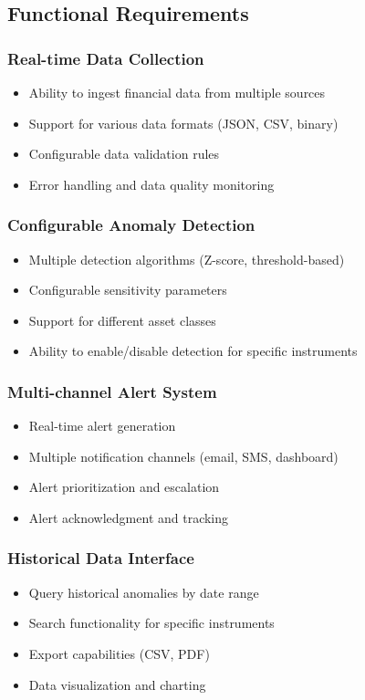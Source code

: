 \subsection{Functional Requirements}

\subsubsection{Real-time Data Collection}
\begin{itemize}
    \item Ability to ingest financial data from multiple sources
    \item Support for various data formats (JSON, CSV, binary)
    \item Configurable data validation rules
    \item Error handling and data quality monitoring
\end{itemize}

\subsubsection{Configurable Anomaly Detection}
\begin{itemize}
    \item Multiple detection algorithms (Z-score, threshold-based)
    \item Configurable sensitivity parameters
    \item Support for different asset classes
    \item Ability to enable/disable detection for specific instruments
\end{itemize}

\subsubsection{Multi-channel Alert System}
\begin{itemize}
    \item Real-time alert generation
    \item Multiple notification channels (email, SMS, dashboard)
    \item Alert prioritization and escalation
    \item Alert acknowledgment and tracking
\end{itemize}

\subsubsection{Historical Data Interface}
\begin{itemize}
    \item Query historical anomalies by date range
    \item Search functionality for specific instruments
    \item Export capabilities (CSV, PDF)
    \item Data visualization and charting
\end{itemize}

